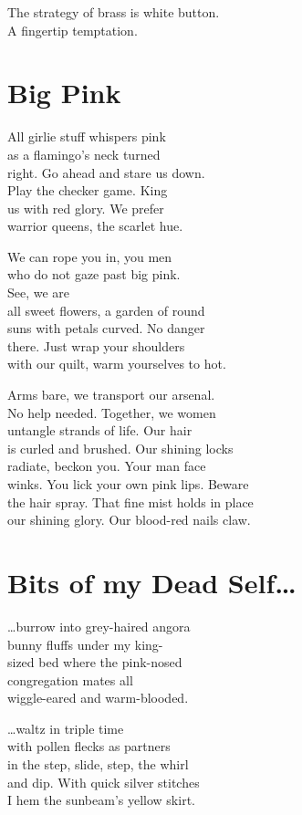 \documentclass[twoside,10pt]{book}
\begin{document}
The strategy of brass is white button.\\
A fingertip temptation.

\clearpage
\section{Big Pink}

All girlie stuff whispers pink\\
as a flamingo's neck turned\\
right. Go ahead and stare us down.\\
Play the checker game. King\\
us with red glory. We prefer\\
warrior queens, the scarlet hue.

We can rope you in, you men\\
who do not gaze past big pink.\\
See, we are\\
all sweet flowers, a garden of round\\
suns with petals curved. No danger\\
there. Just wrap your shoulders\\
with our quilt, warm yourselves to hot.

Arms bare, we transport our arsenal.\\
No help needed. Together, we women\\
untangle strands of life. Our hair\\
is curled and brushed. Our shining locks\\
radiate, beckon you. Your man face\\
winks. You lick your own pink lips. Beware\\
the hair spray. That fine mist holds in place\\
our shining glory. Our blood-red nails claw.

\clearpage
\section{Bits of my Dead Self\ldots{}}

\ldots burrow into grey-haired angora\\
bunny fluffs under my king-\\
sized bed where the pink-nosed\\
congregation mates all\\
wiggle-eared and warm-blooded.

\ldots waltz in triple time\\
with pollen flecks as partners\\
in the step, slide, step, the whirl\\
and dip. With quick silver stitches\\
I hem the sunbeam's yellow skirt.
\end{document}
